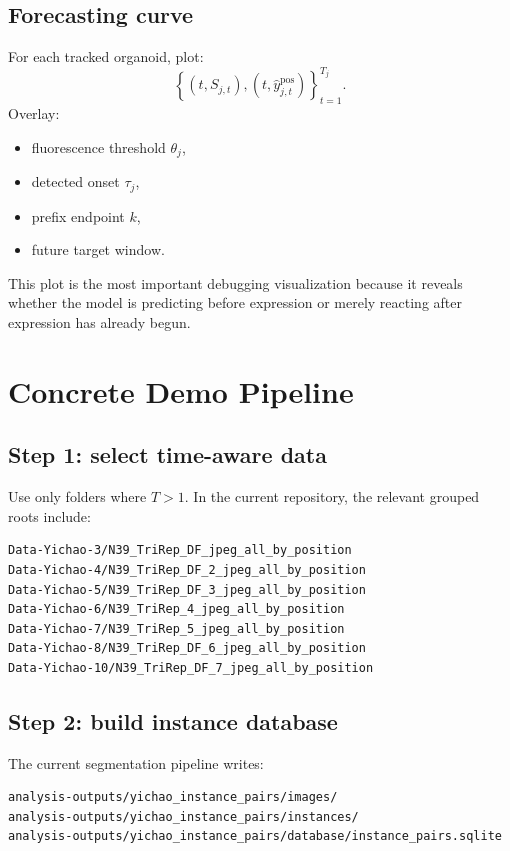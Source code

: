 \documentclass[11pt]{article}
\newcommand{\1}{\mathbf{1}}
\begin{document}
\subsection{Forecasting curve}
For each tracked organoid, plot:
\begin{equation}
\left\{(t,S_{j,t}), (t,\hat{y}_{j,t}^{\mathrm{pos}})\right\}_{t=1}^{T_j}.
\end{equation}
Overlay:
\begin{itemize}[leftmargin=1.5em]
  \item fluorescence threshold \(\theta_j\),
  \item detected onset \(\tau_j\),
  \item prefix endpoint \(k\),
  \item future target window.
\end{itemize}

This plot is the most important debugging visualization because it reveals whether the model is predicting before expression or merely reacting after expression has already begun.

\section{Concrete Demo Pipeline}
\subsection{Step 1: select time-aware data}
Use only folders where \(T>1\). In the current repository, the relevant grouped roots include:
\begin{verbatim}
Data-Yichao-3/N39_TriRep_DF_jpeg_all_by_position
Data-Yichao-4/N39_TriRep_DF_2_jpeg_all_by_position
Data-Yichao-5/N39_TriRep_DF_3_jpeg_all_by_position
Data-Yichao-6/N39_TriRep_4_jpeg_all_by_position
Data-Yichao-7/N39_TriRep_5_jpeg_all_by_position
Data-Yichao-8/N39_TriRep_DF_6_jpeg_all_by_position
Data-Yichao-10/N39_TriRep_DF_7_jpeg_all_by_position
\end{verbatim}

\subsection{Step 2: build instance database}
The current segmentation pipeline writes:
\begin{verbatim}
analysis-outputs/yichao_instance_pairs/images/
analysis-outputs/yichao_instance_pairs/instances/
analysis-outputs/yichao_instance_pairs/database/instance_pairs.sqlite
\end{verbatim}
\end{document}
